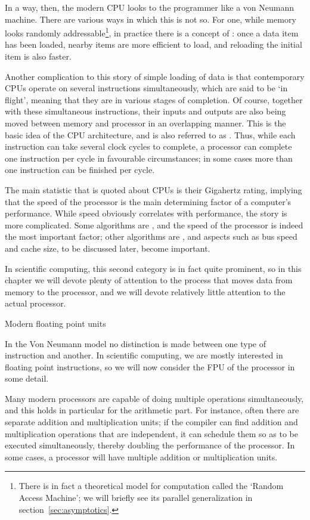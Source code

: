 In a way, then, the modern CPU looks to the programmer like a von
Neumann machine. There are various ways in which this is not so. For
one, while memory looks randomly addressable\footnote{There is in fact
  a theoretical model for computation called the `Random Access
  Machine'; we will briefly see its parallel generalization in
  section~\ref{sec:asymptotics}.}, in practice there is a concept of
: once a data item has been loaded, nearby items
are more efficient to load, and reloading the initial item is also faster.

Another complication to this story of simple loading of data is that
contemporary CPUs operate on several
instructions simultaneously, which are said to be `in flight', meaning
that they are in various stages of completion. 
Of course, together with these simultaneous instructions, their inputs
and outputs are also being moved between memory and processor in an
overlapping manner.
This is the basic idea
of the  CPU architecture, and is also referred
to as . Thus, while each
instruction can take several clock cycles to complete, a processor can
complete one instruction per cycle in favourable circumstances; in
some cases more than one instruction can be finished per cycle.
 
The main statistic that is quoted about CPUs is their 
Gigahertz rating, implying that the speed of the processor is the main
determining factor of a computer's performance. While speed obviously
correlates with performance, the story is more complicated. Some
algorithms are , and the speed of the processor
is indeed the most important factor; other algorithms are
, and aspects such as bus speed and cache
size, to be discussed later,
become important.

In scientific computing, this second category is in fact quite
prominent, so in this chapter we will devote plenty of attention to
the process that moves data from memory to the processor, and we will
devote relatively little attention to the actual processor.

 {Modern floating point units}
\label{sec:fp}

In the Von Neumann model no distinction is made between one type of
instruction and another. In scientific computing, we are mostly
interested in floating point instructions, so we will now consider the
\acf{FPU} of the processor in some detail.

Many modern processors are capable of doing multiple operations
simultaneously, and this holds in particular for the arithmetic
part. For instance, often there are separate addition and
multiplication units; if the compiler can find addition and
multiplication operations that are independent, it can schedule them
so as to be executed simultaneously, thereby doubling the performance
of the processor. In some cases, a processor will have multiple
addition or multiplication units.

